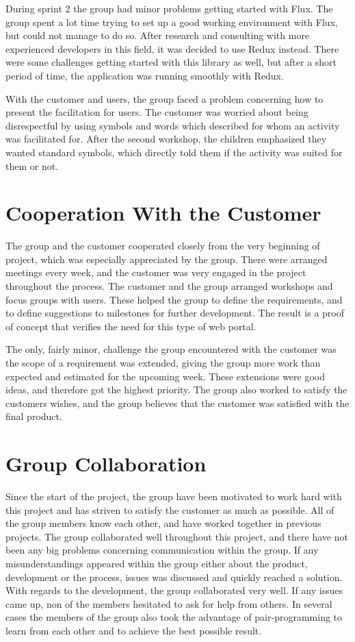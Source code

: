 During sprint 2 the group had minor problems getting started with Flux. The group spent a lot time trying to set up a good working environment with Flux, but could not manage to do so. After research and consulting with more experienced developers in this field, it was decided to use Redux instead. There were some challenges getting started with this library as well, but after a short period of time, the application was running smoothly with Redux. 

With the customer and users, the group faced a problem concerning how to present the facilitation for users. The customer was worried about being disrespectful by using symbols and words which described for whom an activity was facilitated for. After the second workshop, the children emphasized they wanted standard symbols, which directly told them if the activity was suited for them or not.    


\section{Cooperation With the Customer}
The group and the customer cooperated closely from the very beginning of project, which was especially appreciated by the group. There were arranged meetings every week, and the customer was very engaged in the project throughout the process. The customer and the group arranged workshops and focus groups with users. These helped the group to define the requirements, and to define suggestions to milestones for further development. The result is a proof of concept that verifies the need for this type of web portal.

The only, fairly minor, challenge the group encountered with the customer was the scope of a requirement was extended, giving the group more work than expected and estimated for the upcoming week. These extensions were good ideas, and therefore got the highest priority. The group also worked to satisfy the customers wishes, and the group believes that the customer was satisfied with the final product.


\section{Group Collaboration}
Since the start of the project, the group have been motivated to work hard with this project and has striven to satisfy the customer as much as possible. All of the group members know each other, and have worked together in previous projects. The group collaborated well throughout this project, and there have not been any big problems concerning communication within the group. If any misunderstandings appeared within the group either about the product, development or the process, issues was discussed and quickly reached a solution. With regards to the development, the group collaborated very well. If any issues came up, non of the members hesitated to ask for help from others. In several cases the members of the group also took the advantage of pair-programming to learn from each other and to achieve the best possible result.

